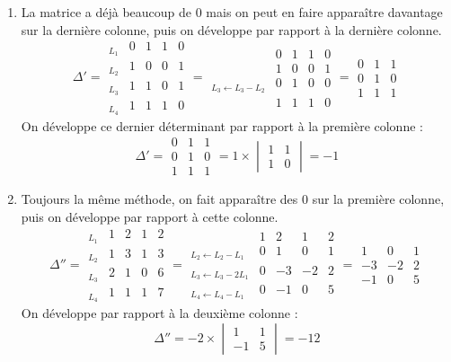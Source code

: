 \documentclass[11pt,a4paper]{article}
\begin{document}
\begin{enumerate}
  \item La matrice a déjà beaucoup de $0$ mais on peut en faire apparaître davantage sur la dernière colonne, puis on développe par rapport à la dernière colonne.
$$
\Delta'= \begin{array}{l|cccc|} 
_{L_1} & 0 & 1 & 1 & 0\\ _{L_2} & 1 & 0 & 0 & 1\\ _{L_3} & 1 & 1 & 0 & 1\\  _{L_4} & 1 & 1 & 1 &0  
\end{array}
= \begin{array}{l|cccc|}  & 0 & 1 & 1 & 0\\  & 1 & 0 & 0 & 1\\ _{L_3 \leftarrow L_3-L_2} & 0 & 1 & 0 & 0 \\  & 1 & 1 & 1 &0  
\end{array}
= \begin{array}{|ccc|}  0 & 1 & 1 \\  0 & 1 & 0  \\   1 & 1 & 1  
\end{array}
$$
On développe ce dernier déterminant par rapport à la première colonne :
$$ \Delta'=\begin{array}{|ccc|}  0 & 1 & 1 \\  0 & 1 & 0  \\   1 & 1 & 1  
\end{array} = 1 \times \begin{vmatrix} 1 & 1 \\ 1 & 0 \end{vmatrix} = -1$$

  \item Toujours la même méthode, on fait apparaître des $0$ sur la première colonne, puis on développe par rapport à cette colonne.
$$
\Delta''= \begin{array}{l|cccc|} 
_{L_1} & 1 & 2 & 1 & 2\\  _{L_2} &1 & 3 & 1 & 3\\  _{L_3} &2 & 1 & 0& 6\\  _{L_4} &1 & 1& 1&7\end{array}
=\begin{array}{l|cccc|}  & 1 & 2 & 1 & 2\\  _{L_2\leftarrow L_2-L_1} &0 & 1 & 0 & 1\\  _{L_3\leftarrow L_3-2L_1} & 0 & -3 & -2 & 2 \\ 
 _{L_4\leftarrow L_4-L_1} & 0 & -1 & 0 & 5 \end{array}
= \begin{array}{|ccc|} 1 & 0 & 1\\-3 & -2 & 2 \\ -1 & 0 & 5 \end{array}
$$
On développe par rapport à la deuxième colonne :
$$\Delta''= -2 \times \begin{vmatrix}  1 & 1 \\ -1 & 5 \end{vmatrix} = -12$$
\end{enumerate}
\end{document}
